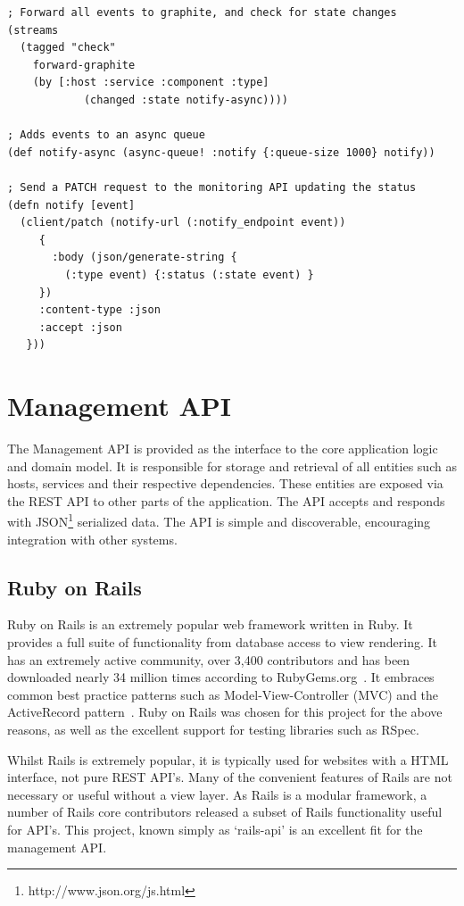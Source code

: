 \documentclass{cshonours}
\begin{document}
\pagebreak
\begin{verbatim}
; Forward all events to graphite, and check for state changes
(streams
  (tagged "check"
    forward-graphite
    (by [:host :service :component :type]
            (changed :state notify-async))))

; Adds events to an async queue
(def notify-async (async-queue! :notify {:queue-size 1000} notify))

; Send a PATCH request to the monitoring API updating the status
(defn notify [event]
  (client/patch (notify-url (:notify_endpoint event))
     {
       :body (json/generate-string {
         (:type event) {:status (:state event) }
     })
     :content-type :json
     :accept :json
   }))
\end{verbatim}

\pagebreak
\section{Management API}

The Management API is provided as the interface to the core application logic and domain model. It is responsible for storage and retrieval of all entities such as hosts, services and their respective dependencies. These entities are exposed via the REST API to other parts of the application. The API accepts and responds with JSON\footnote{http://www.json.org/js.html} serialized data. The API is simple and discoverable, encouraging integration with other systems.

\subsection{Ruby on Rails}

Ruby on Rails is an extremely popular web framework written in Ruby. It provides a full suite of functionality from database access to view rendering. It has an extremely active community, over 3,400 contributors\cite{RailsContrib} and has been downloaded nearly 34 million times according to RubyGems.org~\cite{RailsPopularity}. It embraces common best practice patterns such as Model-View-Controller (MVC) and the ActiveRecord pattern~\cite{ActiveRecord}. Ruby on Rails was chosen for this project for the above reasons, as well as the excellent support for testing libraries such as RSpec.

Whilst Rails is extremely popular, it is typically used for websites with a HTML interface, not pure REST API's. Many of the convenient features of Rails are not necessary or useful without a view layer. As Rails is a modular framework, a number of Rails core contributors released a subset of Rails functionality useful for API's. This project, known simply as `rails-api' is an excellent fit for the management API.
\end{document}
